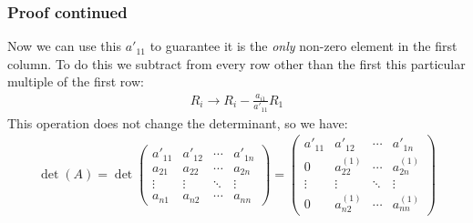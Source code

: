 \documentclass[usenames,dvipsnames,aspectratio=169,10pt]{beamer}
\numberwithin{equation}{section}
\begin{document}
\begin{frame}
\frametitle{Proof continued}

Now we can use this $a'_{11}$ to guarantee it is the \textit{only} non-zero element in the first column. To do this we subtract from every row other than the first this particular multiple of the first row:
\begin{align*}
R_i \to R_i - \frac{a_{i1}}{a'_{11}}R_1
\end{align*}
This operation does not change the determinant, so we have:
\begin{align*}
\det(A)=\det\begin{pmatrix}
a'_{11} & a'_{12} & \cdots & a'_{1n} \\
a_{21} & a_{22} & \cdots & a_{2n} \\
\vdots & \vdots & \ddots & \vdots \\
a_{n1} & a_{n2} & \cdots & a_{nn}
\end{pmatrix}
=
\begin{pmatrix}
a'_{11} & a'_{12} & \cdots & a'_{1n} \\
0 & a^{(1)}_{22} & \cdots & a^{(1)}_{2n} \\
\vdots & \vdots & \ddots & \vdots \\
0 & a^{(1)}_{n2} & \cdots & a^{(1)}_{nn}
\end{pmatrix}
\end{align*}
\end{frame}
\end{document}

